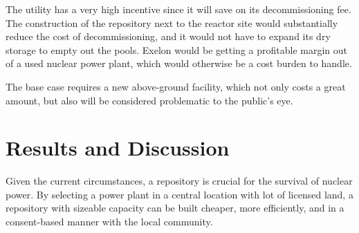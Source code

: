The utility has a very high incentive since it will save on its decommissioning fee.
The construction of the repository next to the reactor site would substantially
reduce the cost of decommissioning, and it would not have to expand its dry storage
to empty out the pools. Exelon would be getting a profitable margin out of a
used nuclear power plant, which would otherwise be a cost burden to handle.

The base case requires a new above-ground facility, which not only costs a great
amount, but also will be considered problematic to the public's eye. 


\section{Results and Discussion} 
Given the current circumstances, a repository is crucial for the survival of nuclear
power. By selecting a power plant in a central location with lot of licensed land,
a repository with sizeable capacity can be built cheaper, more efficiently, and 
in a consent-based manner with the local community. 
